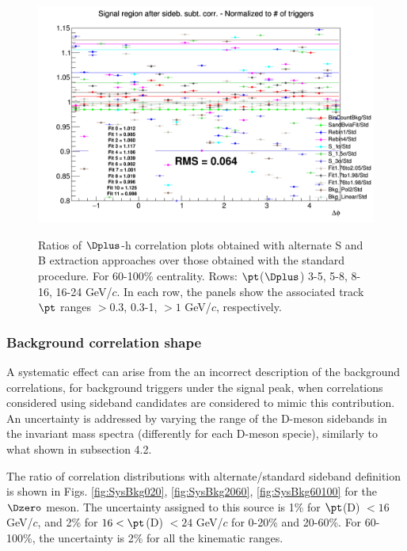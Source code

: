 \begin{figure}
{\includegraphics[width=0.31\linewidth]{Centrality_DPlus/Dplus/Systematic/60_100/Yield/Ratio_AzimCorrDistr_Dplus_Canvas_PtIntBins11to11_PoolInt_thr1dotto99dot.png}} \\
 \caption{Ratios of $\Dplus$-h correlation plots obtained with alternate S and B extraction approaches over those obtained with the standard procedure. For 60-100\% centrality. Rows: $\pt$($\Dplus$) 3-5, 5-8, 8-16, 16-24 GeV/$c$. In each row, the panels show the associated track
$\pt$ ranges $> 0.3$, 0.3-1, $> 1$ GeV/$c$, respectively.}
\label{fig:SysSandB60100_Dplus}
\end{figure}

\subsubsection{Background correlation shape}
A systematic effect can arise from the an incorrect description of the background correlations, for background triggers under the signal peak, when correlations considered using sideband candidates are considered to mimic this contribution. An uncertainty is addressed by varying the range of the D-meson sidebands in the invariant mass spectra (differently for each D-meson specie), similarly to what shown in subsection 4.2.

The ratio of correlation distributions with alternate/standard sideband definition is shown in Figs. \ref{fig:SysBkg020}, \ref{fig:SysBkg2060}, \ref{fig:SysBkg60100} for the $\Dzero$ meson. The uncertainty assigned to this source is 1\% for $\pt$(D) $< 16$ GeV/$c$, and 2\% for $16 < \pt$(D) $< 24$ GeV/$c$ for 0-20\% and 20-60\%. For 60-100\%, the uncertainty is 2\% for all the kinematic ranges.

